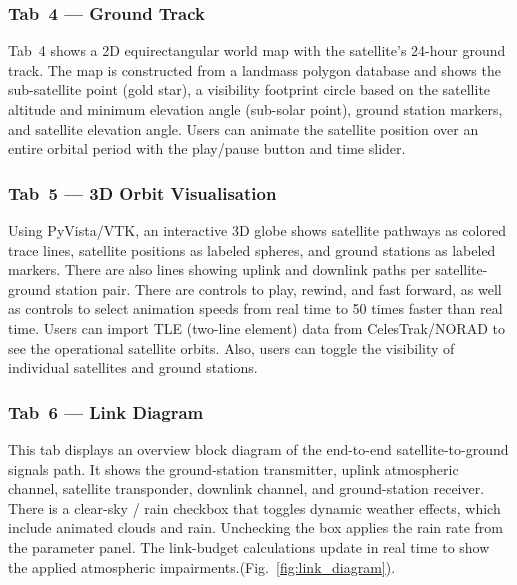 \documentclass[telecom,article,submit,pdftex,moreauthors]{Definitions/mdpi}
\begin{document}
\subsubsection{\textbf{Tab~4 — Ground Track}}
Tab~4 shows a 2D equirectangular world map with the satellite's 24-hour ground track. The map is constructed from a landmass polygon database and shows the sub-satellite point (gold star), a visibility footprint circle based on the satellite altitude and minimum elevation angle (sub-solar point), ground station markers, and satellite elevation angle. Users can animate the satellite position over an entire orbital period with the play/pause button and time slider.



\subsubsection{\textbf{Tab~5 — 3D Orbit Visualisation}}
Using PyVista/VTK, an interactive 3D globe shows satellite pathways as colored trace lines, satellite positions as labeled spheres, and ground stations as labeled markers. There are also lines showing uplink and downlink paths per satellite-ground station pair. There are controls to play, rewind, and fast forward, as well as controls to select animation speeds from real time to 50 times faster than real time. Users can import TLE (two-line element) data from CelesTrak/NORAD to see the operational satellite orbits. Also, users can toggle the visibility of individual satellites and ground stations.



\subsubsection{\textbf{Tab~6 — Link Diagram}}
This tab displays an overview block diagram of the end-to-end satellite-to-ground signals path. It shows the ground-station transmitter, uplink atmospheric channel, satellite transponder, downlink channel, and ground-station receiver. There is a clear-sky / rain checkbox that toggles dynamic weather effects, which include animated clouds and rain. Unchecking the box applies the rain rate from the parameter panel. The link-budget calculations update in real time to show the applied atmospheric impairments.(Fig.~\ref{fig:link_diagram}).
\end{document}
